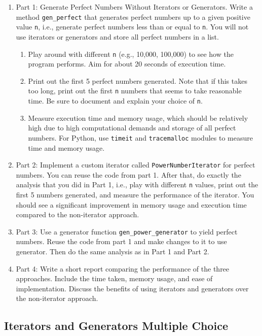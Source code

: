 \documentclass[oneside,11pt,dvipsnames]{book}
\newcommand{\code}[1]{\texttt{#1}}
\begin{document}
\begin{enumerate}
\item Part 1: Generate Perfect Numbers Without Iterators or Generators.  Write a method \code{gen\_perfect} that generates perfect numbers up to a given positive value \code{n}, i.e., generate perfect numbers less than or equal to \code{n}.  You will not use iterators or generators and store all perfect numbers in a list.
\begin{enumerate}
    \item Play around with different \code{n} (e.g., 10,000, 100,000) to see how the program performs. Aim for about 20 seconds of execution time.
    \item Print out the first 5 perfect numbers generated. Note that if this takes too long, print out the first \code{n} numbers that seems to take reasonable time.  Be sure to document and explain your choice of \code{n}.
    \item Measure execution time and memory usage, which should be relatively high due to high computational demands and storage of all perfect numbers.  For Python, use \code{timeit} and \code{tracemalloc} modules to measure time and memory usage.
\end{enumerate}

\item Part 2: Implement a custom iterator called \code{PowerNumberIterator} for perfect numbers. You can reuse the code from part 1.  After that, do exactly the analysis that you did in Part 1, i.e., play with different \code{n} values, print out the first 5 numbers generated, and measure the performance of the iterator.  You should see a significant improvement in memory usage and execution time compared to the non-iterator approach.
\item Part 3: Use a generator function \code{gen\_power\_generator} to yield perfect numbers.  Reuse the code from part 1 and make changes to it to use generator.  Then do the same analysis as in Part 1 and Part 2.
\item Part 4: Write a short report comparing the performance of the three approaches.  Include the time taken, memory usage, and ease of implementation.  Discuss the benefits of using iterators and generators over the non-iterator approach.
\end{enumerate}

\subsection{Iterators and Generators Multiple Choice}
\end{document}
